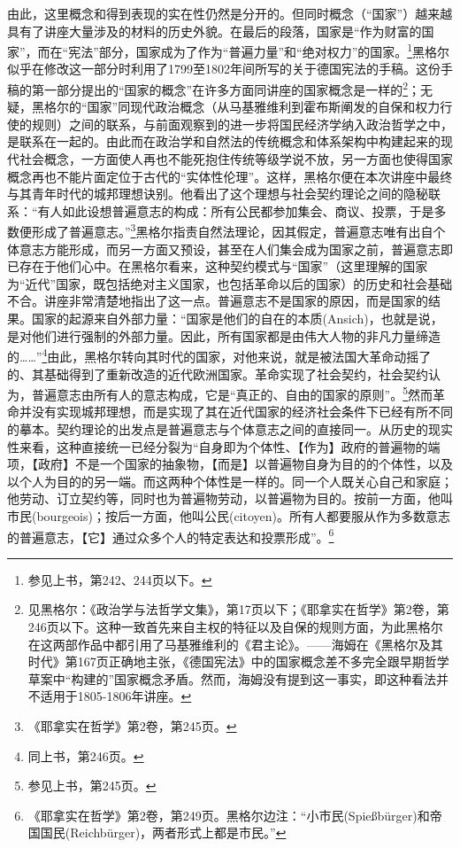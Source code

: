 由此，这里概念和得到表现的实在性仍然是分开的。但同时概念（“国家”）越来越具有了讲座大量涉及的材料的历史外貌。在最后的段落，国家是“作为财富的国家”，而在“宪法”部分，国家成为了作为“普遍力量”和“绝对权力”的国家。\footnote{参见上书，第242、244页以下。}黑格尔似乎在修改这一部分时利用了1799至1802年间所写的关于德国宪法的手稿。这份手稿的第一部分提出的“国家的概念”在许多方面同讲座的国家概念是一样的\footnote{见黑格尔：《政治学与法哲学文集》，第17页以下；《耶拿实在哲学》第2卷，第246页以下。这种一致首先来自主权的特征以及自保的规则方面，为此黑格尔在这两部作品中都引用了马基雅维利的《君主论》。——海姆在《黑格尔及其时代》第167页正确地主张，《德国宪法》中的国家概念差不多完全跟早期哲学草案中“构建的”国家概念矛盾。然而，海姆没有提到这一事实，即这种看法并不适用于1805-1806年讲座。}；无疑，黑格尔的“国家”同现代政治概念（从马基雅维利到霍布斯阐发的自保和权力行使的规则）之间的联系，与前面观察到的进一步将国民经济学纳入政治哲学之中，是联系在一起的。由此而在政治学和自然法的传统概念和体系架构中构建起来的现代社会概念，一方面使人再也不能死抱住传统等级学说不放，另一方面也使得国家概念再也不能片面定位于古代的“实体性伦理”。这样，黑格尔便在本次讲座中最终与其青年时代的城邦理想诀别。他看出了这个理想与社会契约理论之间的隐秘联系：“有人如此设想普遍意志的构成：所有公民都参加集会、商议、投票，于是多数便形成了普遍意志。”\footnote{《耶拿实在哲学》第2卷，第245页。}黑格尔指责自然法理论，因其假定，普遍意志唯有出自个体意志方能形成，而另一方面又预设，甚至在人们集会成为国家之前，普遍意志即已存在于他们心中。在黑格尔看来，这种契约模式与“国家”（这里理解的国家为“近代”国家，既包括绝对主义国家，也包括革命以后的国家）的历史和社会基础不合。讲座非常清楚地指出了这一点。普遍意志不是国家的原因，而是国家的结果。国家的起源来自外部力量：“国家是他们的自在的本质(Ansich)，也就是说，是对他们进行强制的外部力量。因此，所有国家都是由伟大人物的非凡力量缔造的……”\footnote{同上书，第246页。}由此，黑格尔转向其时代的国家，对他来说，就是被法国大革命动摇了的、其基础得到了重新改造的近代欧洲国家。革命实现了社会契约，社会契约认为，普遍意志由所有人的意志构成，它是“真正的、自由的国家的原则”。\footnote{参见上书，第245页。}然而革命并没有实现城邦理想，而是实现了其在近代国家的经济社会条件下已经有所不同的摹本。契约理论的出发点是普遍意志与个体意志之间的直接同一。从历史的现实性来看，这种直接统一已经分裂为“自身即为个体性、【作为】政府的普遍物的端项，【政府】不是一个国家的抽象物，【而是】以普遍物自身为目的的个体性，以及以个人为目的的另一端。而这两种个体性是一样的。同一个人既关心自己和家庭；他劳动、订立契约等，同时也为普遍物劳动，以普遍物为目的。按前一方面，他叫市民(bourgeois)；按后一方面，他叫公民(citoyen)。所有人都要服从作为多数意志的普遍意志，【它】通过众多个人的特定表达和投票形成”。\footnote{《耶拿实在哲学》第2卷，第249页。黑格尔边注：“小市民(Spießbürger)和帝国国民(Reichbürger)，两者形式上都是市民。”}

